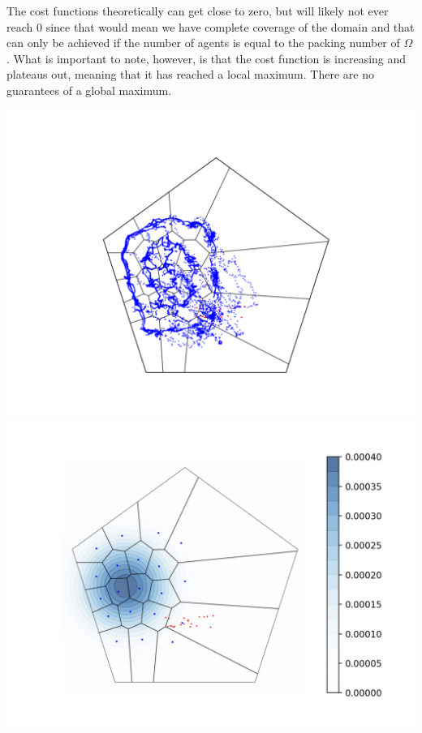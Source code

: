 \documentclass[10pt,conference]{IEEEtran}
\begin{document}
The cost functions theoretically can get close to zero, but will likely not ever reach $0$ since that would mean we have complete coverage of the domain and that can only be achieved if the number of agents is equal to the packing number of $\Omega$. What is important to note, however, is that the cost function is increasing and plateaus out, meaning that it has reached a local maximum. There are no guarantees of a global maximum.
\begin{center}
	\includegraphics[scale=.2]{poster_sim1_tracking}
	\includegraphics[scale=.2]{poster_sim1_final}

\end{center}
\end{document}
